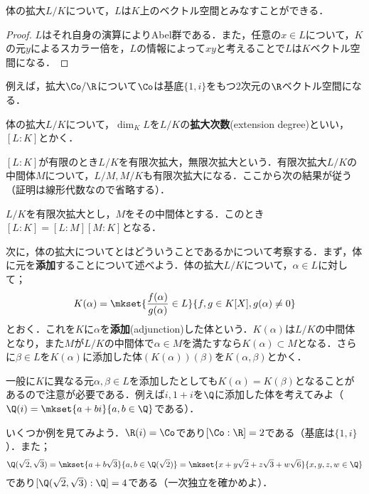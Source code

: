\begin{prop}
	体の拡大$L/K$について，$L$は$K$上のベクトル空間とみなすことができる．
\end{prop}

\begin{proof}
	$L$はそれ自身の演算によりAbel群である．また，任意の$x\in L$について，$K$の元$y$によるスカラー倍を，$L$の情報によって$xy$と考えることで$L$は$K$ベクトル空間になる．
\end{proof}

例えば，拡大$\Co/\R$について$\Co$は基底$\{1,i\}$をもつ$2$次元の$\R$ベクトル空間になる．

\begin{defi}[拡大次数]
	体の拡大$L/K$について，$\dim_K L$を$L/K$の\textbf{拡大次数}(extension degree)といい，$[L:K]$とかく．
\end{defi}

$[L:K]$が有限のとき$L/K$を有限次拡大，無限次拡大という．有限次拡大$L/K$の中間体$M$について，$L/M,M/K$も有限次拡大になる．ここから次の結果が従う（証明は線形代数なので省略する）．

\begin{prop}
	$L/K$を有限次拡大とし，$M$をその中間体とする．このとき$[L:K]=[L:M][M:K]$となる．
\end{prop}

次に，体の拡大についてとはどういうことであるかについて考察する．まず，体に元を\textbf{添加}することについて述べよう．体の拡大$L/K$について，$\alpha\in L$に対して；
\[K(\alpha)=\mkset{\frac{f(\alpha)}{g(\alpha)}\in L}{f,g\in K[X],g(\alpha)\neq0}\]
とおく．これを$K$に$\alpha$を\textbf{添加}(adjunction)した体という．$K(\alpha)$は$L/K$の中間体となり，また$M$が$L/K$の中間体で$\alpha\in M$を満たすなら$K(\alpha)\subset M$となる．さらに$\beta\in L$を$K(\alpha)$に添加した体$(K(\alpha))(\beta)$を$K(\alpha,\beta)$とかく．

一般に$K$に異なる元$\alpha,\beta\in L$を添加したとしても$K(\alpha)=K(\beta)$となることがあるので注意が必要である．例えば$i,1+i$を$\Q$に添加した体を考えてみよ（$\Q(i)=\mkset{a+bi}{a,b\in\Q}$である）．

いくつか例を見てみよう．$\R(i)=\Co$であり$[\Co:\R]=2$である（基底は$\{1,i\}$）．また；
\[\Q(\sqrt{2},\sqrt{3})=\mkset{a+b\sqrt{3}}{a,b\in\Q(\sqrt{2})}=\mkset{x+y\sqrt{2}+z\sqrt{3}+w\sqrt{6}}{x,y,z,w\in\Q}\]
であり$[\Q(\sqrt{2},\sqrt{3}):\Q]=4$である（一次独立を確かめよ）．

